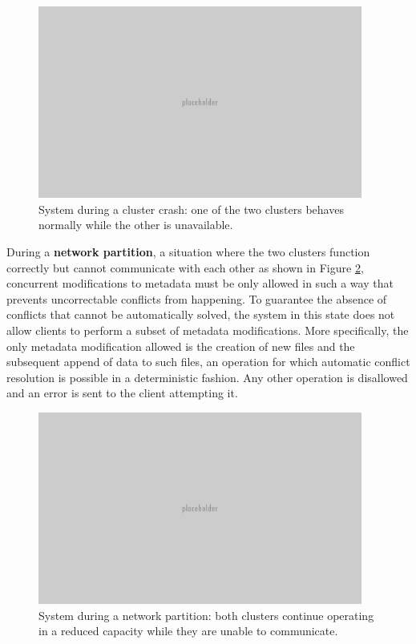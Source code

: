 \begin{figure}[h]
\caption{System during a cluster crash: one of the two clusters behaves normally while the other is unavailable.}
\label{fig:system-cluster-crash}
\centering
\includegraphics[width=0.95\textwidth]{images/placeholder.png}
\end{figure}

During a \textbf{network partition}, a situation where the two clusters function correctly but cannot communicate with each other as shown in Figure \ref{fig:system-network-partition}, concurrent modifications to metadata must be only allowed in such a way that prevents uncorrectable conflicts from happening.
To guarantee the absence of conflicts that cannot be automatically solved, the system in this state does not allow clients to perform a subset of metadata modifications.
More specifically, the only metadata modification allowed is the creation of new files and the subsequent append of data to such files, an operation for which automatic conflict resolution is possible in a deterministic fashion.
Any other operation is disallowed and an error is sent to the client attempting it.

\begin{figure}[h]
\caption{System during a network partition: both clusters continue operating in a reduced capacity while they are unable to communicate.}
\label{fig:system-network-partition}
\centering
\includegraphics[width=0.95\textwidth]{images/placeholder.png}
\end{figure}


